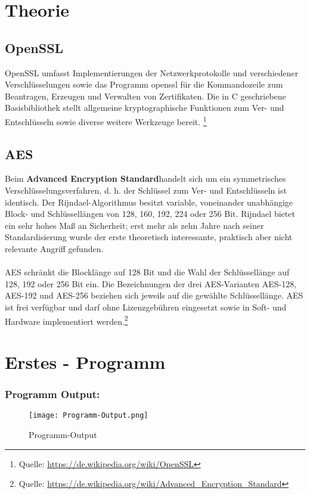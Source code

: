 \newpage

\section{Theorie}
\subsection{OpenSSL}
OpenSSL umfasst Implementierungen der Netzwerkprotokolle und verschiedener
Verschlüsselungen sowie das Programm openssl für die Kommandozeile zum Beantragen, 
Erzeugen und Verwalten von Zertifikaten. Die in C geschriebene Basisbibliothek stellt allgemeine 
kryptographische Funktionen zum Ver- und Entschlüsseln sowie diverse weitere Werkzeuge bereit.
\footnote{Quelle: \url{https://de.wikipedia.org/wiki/OpenSSL}}


\subsection{AES}
Beim \textbf{Advanced Encryption Standard}handelt sich um ein symmetrisches Verschlüsselungsverfahren, d. h. 
der Schlüssel zum Ver- und Entschlüsseln ist identisch. Der Rijndael-Algorithmus besitzt variable, voneinander unabhängige Block- und 
Schlüssellängen von 128, 160, 192, 224 oder 256 Bit. Rijndael bietet ein sehr hohes Maß an Sicherheit; erst mehr als zehn Jahre nach seiner 
Standardisierung wurde der erste theoretisch interessante, praktisch aber nicht relevante Angriff gefunden.
\\
\\
AES schränkt die Blocklänge auf 128 Bit und die Wahl der Schlüssellänge auf 128, 192 oder 256 Bit ein. Die Bezeichnungen der
drei AES-Varianten AES-128, AES-192 und AES-256 beziehen sich jeweils auf die gewählte Schlüssellänge. AES ist frei verfügbar 
und darf ohne Lizenzgebühren eingesetzt sowie in Soft- und Hardware implementiert werden.\footnote{Quelle: \url{https://de.wikipedia.org/wiki/Advanced_Encryption_Standard}}


\newpage
\section{Erstes - Programm}


\subsubsection{Programm Output:}
\begin{figure}[!htb]
    \centering
    \texttt{[image: Programm-Output.png]}
    \caption{Programm-Output}
    \label{caption:Programm-Output}
\end{figure}

